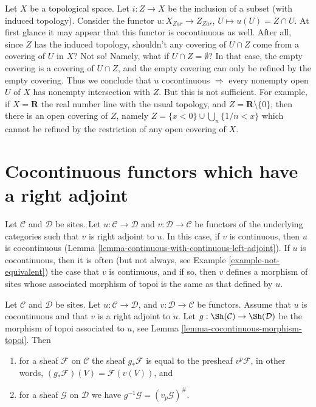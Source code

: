 \begin{example}
\label{example-closed-map-cocontinuous-false}
Let $X$ be a topological space.
Let $i : Z  \to X$ be the inclusion of a subset (with induced
topology). Consider the functor $u : X_{Zar} \to Z_{Zar}$,
$U \mapsto u(U) = Z \cap U$.
At first glance it may appear that this functor is cocontinuous as
well. After all, since $Z$ has the induced topology,
shouldn't any covering of $U\cap Z$ come from a covering
of $U$ in $X$? Not so! Namely, what if $U \cap Z = \emptyset$?
In that case, the empty covering is a covering of
$U \cap Z$, and the empty covering can only be refined by
the empty covering. Thus we conclude that
$u$ cocontinuous $\Rightarrow$ every nonempty open $U$
of $X$ has nonempty intersection with $Z$.
But this is not sufficient. For example, if
$X = \mathbf{R}$ the real number line with the usual
topology, and $Z = \mathbf{R} \setminus \{0\}$, then
there is an open covering of $Z$, namely
$Z = \{x < 0\} \cup \bigcup_n \{1/n < x\}$ which
cannot be refined by the restriction of any
open covering of $X$.
\end{example}







\section{Cocontinuous functors which have a right adjoint}
\label{section-cocontinuous-adjoint}

\noindent
Let $\mathcal{C}$ and $\mathcal{D}$ be sites. Let
$u : \mathcal{C} \to \mathcal{D}$ and $v : \mathcal{D} \to \mathcal{C}$
be functors of the underlying categories such that $v$ is right adjoint to $u$.
In this case, if $v$ is continuous, then $u$ is cocontinuous
(Lemma \ref{lemma-continuous-with-continuous-left-adjoint}).
If $u$ is cocontinuous, then it is often
(but not always, see Example \ref{example-not-equivalent})
the case that $v$ is continuous, and if so, then
$v$ defines a morphism of sites whose
associated morphism of topoi is the same as that defined by $u$.

\begin{lemma}
\label{lemma-have-functor-other-way}
Let $\mathcal{C}$ and $\mathcal{D}$ be sites. Let
$u : \mathcal{C} \to \mathcal{D}$, and $v : \mathcal{D} \to \mathcal{C}$
be functors. Assume that $u$ is cocontinuous
and that $v$ is a right adjoint to $u$.
Let $g : \Sh(\mathcal{C}) \to \Sh(\mathcal{D})$ be
the morphism of topoi associated to $u$, see
Lemma \ref{lemma-cocontinuous-morphism-topoi}.
Then
\begin{enumerate}
\item for a sheaf $\mathcal{F}$ on $\mathcal{C}$ the sheaf
$g_*\mathcal{F}$ is equal to the presheaf $v^p\mathcal{F}$, in other words,
$(g_*\mathcal{F})(V) = \mathcal{F}(v(V))$, and
\item for a sheaf $\mathcal{G}$ on $\mathcal{D}$ we have
$g^{-1}\mathcal{G} = (v_p\mathcal{G})^\#$.
\end{enumerate}
\end{lemma}

